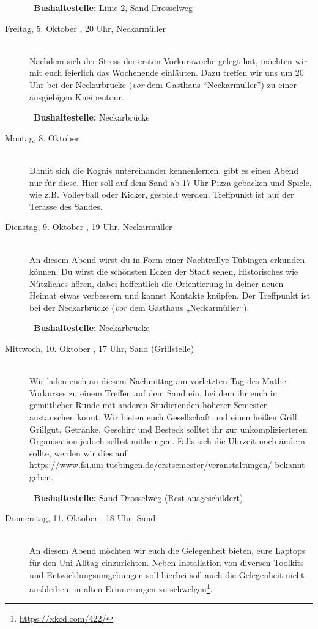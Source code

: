 \begin{description}
~\textbf{Bushaltestelle:} Linie 2, Sand Drosselweg
\fi
\fi


\item[Freitag, 5. Oktober \Jahr, 20 Uhr, Neckarmüller]\ \\
Nachdem sich der Stress der ersten Vorkurswoche gelegt hat, möchten wir mit euch feierlich das Wochenende einläuten.
Dazu treffen wir uns um 20 Uhr bei der Neckarbrücke (\emph{vor} dem Gasthaus "`Neckarmüller"') zu einer ausgiebigen Kneipentour.

~\textbf{Bushaltestelle:} Neckarbrücke


\ifkogwiss

\item[Montag, 8. Oktober \Jahr ]\ \\
Damit sich die Kognis untereinander kennenlernen, gibt es einen Abend nur für diese. Hier soll auf dem Sand ab 17 Uhr Pizza gebacken und  Spiele, wie z.B. Volleyball oder Kicker, gespielt werden.
Treffpunkt ist auf der Terasse des Sandes.
\fi

\item[Dienstag, 9. Oktober \Jahr, 19 Uhr, Neckarmüller]\ \\
An diesem Abend wirst du in Form einer Nachtrallye Tübingen erkunden können. Du wirst die schönsten Ecken der Stadt sehen, Historisches wie Nützliches hören, dabei hoffentlich die Orientierung in deiner neuen Heimat etwas verbessern und kannst Kontakte knüpfen. Der Treffpunkt ist bei der Neckarbrücke (\emph{vor} dem Gasthaus „Neckarmüller“).

~\textbf{Bushaltestelle:} Neckarbrücke

\item[Mittwoch, 10. Oktober \Jahr, 17 Uhr, Sand (Grillstelle)]\ \\
Wir laden euch an diesem Nachmittag am vorletzten Tag des Mathe-Vorkurses zu
einem Treffen auf dem Sand ein, bei dem ihr euch in gemütlicher Runde mit
anderen Studierenden höherer Semester austauschen könnt. Wir bieten euch
Gesellschaft und einen heißen Grill. Grillgut, Getränke, Geschirr und Besteck solltet ihr zur unkomplizierteren Organisation jedoch selbst mitbringen.
Falls sich die Uhrzeit noch ändern sollte, werden wir dies auf \\ \url{https://www.fsi.uni-tuebingen.de/erstsemester/veranstaltungen/} bekannt geben.

~\textbf{Bushaltestelle:} Sand Drosselweg (Rest ausgeschildert)

\item[Donnerstag, 11. Oktober \Jahr, 18 Uhr, Sand]\ \\
An diesem Abend möchten wir euch die Gelegenheit bieten, eure Laptops für den Uni-Alltag einzurichten. Neben Installation von diversen Toolkits und Entwicklungsumgebungen soll hierbei soll auch die Gelegenheit nicht ausbleiben, in alten Erinnerungen zu schwelgen\footnote{\url{https://xkcd.com/422/}}.


\end{description}
